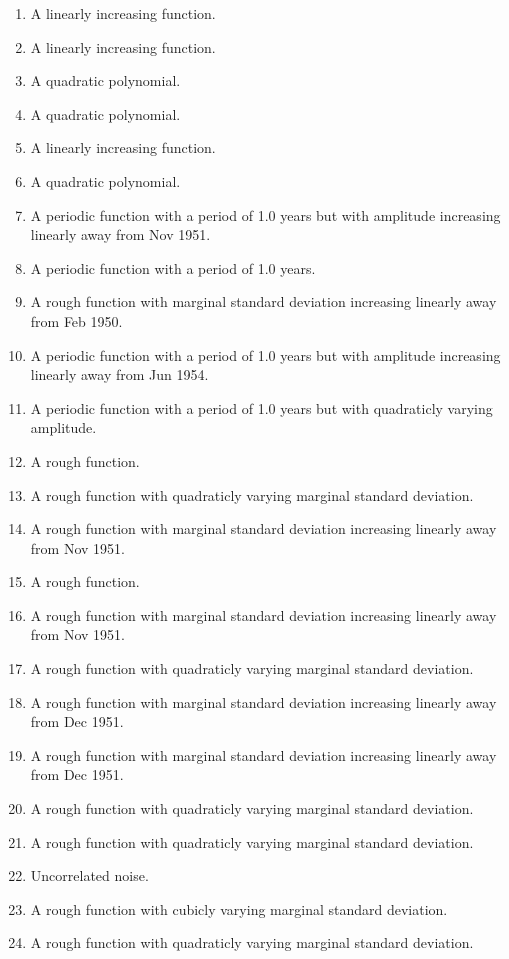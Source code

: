 \documentclass[11pt,a4paper]{article}
\begin{document}
\begin{enumerate}
  \item A linearly increasing function.
  \item A linearly increasing function.
  \item A quadratic polynomial.
  \item A quadratic polynomial.
  \item A linearly increasing function.
  \item A quadratic polynomial.
  \item A periodic function with a period of 1.0 years but with amplitude increasing linearly away from Nov 1951.
  \item A periodic function with a period of 1.0 years.
  \item A rough function with marginal standard deviation increasing linearly away from Feb 1950.
  \item A periodic function with a period of 1.0 years but with amplitude increasing linearly away from Jun 1954.
  \item A periodic function with a period of 1.0 years but with quadraticly varying amplitude.
  \item A rough function.
  \item A rough function with quadraticly varying marginal standard deviation.
  \item A rough function with marginal standard deviation increasing linearly away from Nov 1951.
  \item A rough function.
  \item A rough function with marginal standard deviation increasing linearly away from Nov 1951.
  \item A rough function with quadraticly varying marginal standard deviation.
  \item A rough function with marginal standard deviation increasing linearly away from Dec 1951.
  \item A rough function with marginal standard deviation increasing linearly away from Dec 1951.
  \item A rough function with quadraticly varying marginal standard deviation.
  \item A rough function with quadraticly varying marginal standard deviation.
  \item Uncorrelated noise.
  \item A rough function with cubicly varying marginal standard deviation.
  \item A rough function with quadraticly varying marginal standard deviation.

\end{enumerate}
\end{document}
